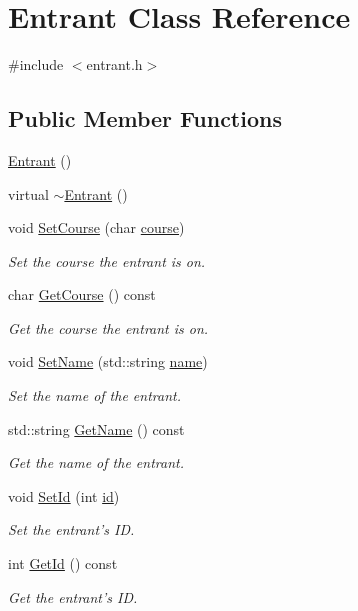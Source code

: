 \hypertarget{classEntrant}{\section{\-Entrant \-Class \-Reference}
\label{classEntrant}
}


{\ttfamily \#include $<$entrant.\-h$>$}

\subsection*{\-Public \-Member \-Functions}
\begin{DoxyCompactItemize}
\item 
\hyperlink{classEntrant_ade9c901c8a9ef5227a1c973f662c6530}{\-Entrant} ()
\item 
virtual \hyperlink{classEntrant_a6f4ee6350535b4e29feb685911babbd2}{$\sim$\-Entrant} ()
\item 
void \hyperlink{classEntrant_a948d4853a46f1871b938b086d7e3d299}{\-Set\-Course} (char \hyperlink{classEntrant_a6a07700d22efca127fb9fe9da2f6e8a6}{course})
\begin{DoxyCompactList}\small\item\em \-Set the course the entrant is on. \end{DoxyCompactList}\item 
char \hyperlink{classEntrant_a09bfff64f7d0cff04c7cbf4bc90be40f}{\-Get\-Course} () const 
\begin{DoxyCompactList}\small\item\em \-Get the course the entrant is on. \end{DoxyCompactList}\item 
void \hyperlink{classEntrant_aded5c26726ac5680d4d4c08de78d3b88}{\-Set\-Name} (std\-::string \hyperlink{classEntrant_a1f90de1d03c5bf4fb5bf4fac2d437129}{name})
\begin{DoxyCompactList}\small\item\em \-Set the name of the entrant. \end{DoxyCompactList}\item 
std\-::string \hyperlink{classEntrant_a79ae7234ca25dd833ce16229805c2993}{\-Get\-Name} () const 
\begin{DoxyCompactList}\small\item\em \-Get the name of the entrant. \end{DoxyCompactList}\item 
void \hyperlink{classEntrant_a444fe74d82503f6bc51fdbfbaf00ed3b}{\-Set\-Id} (int \hyperlink{classEntrant_a38e44f4d077b9570ce24e9bdcb5cd002}{id})
\begin{DoxyCompactList}\small\item\em \-Set the entrant's \-I\-D. \end{DoxyCompactList}\item 
int \hyperlink{classEntrant_a412ae82c38d6a836511f78a8c6f48df4}{\-Get\-Id} () const 
\begin{DoxyCompactList}\small\item\em \-Get the entrant's \-I\-D. \end{DoxyCompactList}\end{DoxyCompactItemize}
